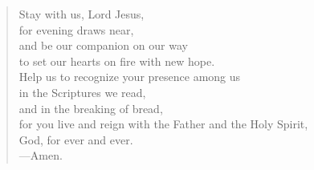 \prayer

\setlength{\vleftmargin}{\prayerleftmargini}

\begin{verse}
Stay with us, Lord Jesus,\\
for evening draws near,\\
and be our companion on our way\\
to set our hearts on fire with new hope.\\
Help us to recognize your presence among us\\
in the Scriptures we read,\\
and in the breaking of bread,\\
for you live and reign with the Father and the Holy Spirit,\\
God, for ever and ever.\\
{\color{red}---\thinspace}Amen.
\end{verse}

\setlength{\vleftmargin}{\defleftmargini}